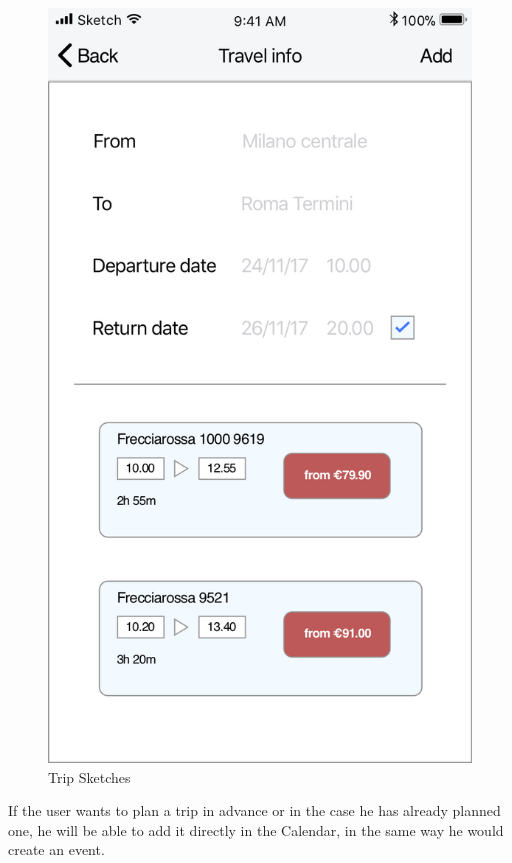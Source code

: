 \begin{enumerate}
\begin{figure}[H]
				\includegraphics[scale=0.25]{Images/Sketch/Trip_2}
				\caption{Trip Sketches}
			\end{figure}
			If the user wants to plan a trip in advance or in the case he has already planned one, he will be able to add it directly in the Calendar, in the same way he would create an event.
			\begin{figure}[H]
				\centering

\end{figure}
\end{enumerate}
